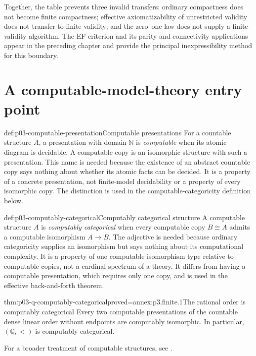 Together, the table prevents three invalid transfers: ordinary compactness does
not become finite compactness; effective axiomatizability of unrestricted
validity does not transfer to finite validity; and the zero--one law does not
supply a finite-validity algorithm.  The EF criterion and its parity and
connectivity applications appear in the preceding chapter and provide the
principal inexpressibility method for this boundary.

\section{A computable-model-theory entry point}
\label{sec:p03-computable-model-theory}

\begin{hbdefinition}{def:p03-computable-presentation}{Computable presentations}
For a countable structure \(A\), a presentation with domain \(\mathbb N\) is
\emph{computable} when its atomic diagram is decidable.  A computable copy is
an isomorphic structure with such a presentation.  This name is needed because
the existence of an abstract countable copy says nothing about whether its
atomic facts can be decided.  It is a property of a concrete presentation,
not finite-model decidability or a property of every isomorphic copy.  The
distinction is used in the computable-categoricity definition below.
\end{hbdefinition}

\begin{hbdefinition}{def:p03-computably-categorical}{Computably categorical structure}
A computable structure \(A\) is \emph{computably categorical} when every
computable copy \(B\cong A\) admits a computable isomorphism \(A\to B\).
The adjective is needed because ordinary categoricity supplies an isomorphism
but says nothing about its computational complexity.  It is a property of one
computable isomorphism type relative to computable copies, not a cardinal
spectrum of a theory.  It differs from having a computable presentation, which
requires only one copy, and is used in the effective back-and-forth theorem.
\end{hbdefinition}

\begin{hbtheorem}{thm:p03-q-computably-categorical}{proved=annex:p3.finite.1}{The rational order is computably categorical}
Every two computable presentations of the countable dense linear order without
endpoints are computably isomorphic.  In particular,
\((\mathbb Q,<)\) is computably categorical.
\end{hbtheorem}

For a broader treatment of computable structures, see
\textcite{AshKnight2000}.
